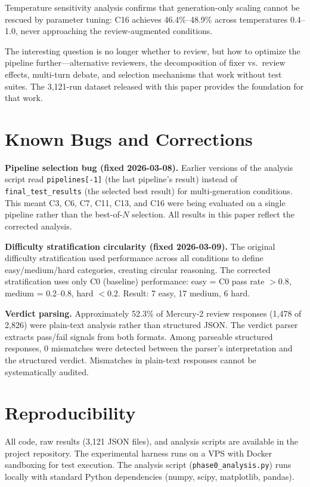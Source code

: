 \documentclass{article}
\begin{document}
Temperature sensitivity analysis confirms that generation-only scaling cannot be rescued by parameter tuning: C16 achieves 46.4\%--48.9\% across temperatures 0.4--1.0, never approaching the review-augmented conditions.

The interesting question is no longer whether to review, but how to optimize the pipeline further---alternative reviewers, the decomposition of fixer vs.\ review effects, multi-turn debate, and selection mechanisms that work without test suites. The 3,121-run dataset released with this paper provides the foundation for that work.

\appendix

\section{Known Bugs and Corrections}
\label{app:bugs}

\textbf{Pipeline selection bug (fixed 2026-03-08).} Earlier versions of the analysis script read \texttt{pipelines[-1]} (the last pipeline's result) instead of \texttt{final\_test\_results} (the selected best result) for multi-generation conditions. This meant C3, C6, C7, C11, C13, and C16 were being evaluated on a single pipeline rather than the best-of-$N$ selection. All results in this paper reflect the corrected analysis.

\textbf{Difficulty stratification circularity (fixed 2026-03-09).} The original difficulty stratification used performance across all conditions to define easy/medium/hard categories, creating circular reasoning. The corrected stratification uses only C0 (baseline) performance: easy = C0 pass rate $>0.8$, medium = 0.2--0.8, hard $<0.2$. Result: 7 easy, 17 medium, 6 hard.

\textbf{Verdict parsing.} Approximately 52.3\% of Mercury-2 review responses (1,478 of 2,826) were plain-text analysis rather than structured JSON. The verdict parser extracts pass/fail signals from both formats. Among parseable structured responses, 0 mismatches were detected between the parser's interpretation and the structured verdict. Mismatches in plain-text responses cannot be systematically audited.

\section{Reproducibility}
\label{app:reproducibility}

All code, raw results (3,121 JSON files), and analysis scripts are available in the project repository. The experimental harness runs on a VPS with Docker sandboxing for test execution. The analysis script (\texttt{phase0\_analysis.py}) runs locally with standard Python dependencies (numpy, scipy, matplotlib, pandas).
\end{document}
